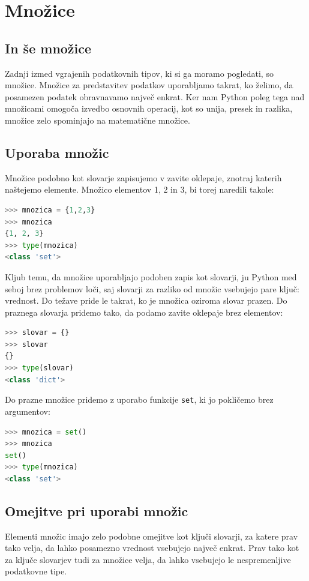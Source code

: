 \chapter{Množice}

\section{In še množice}

Zadnji izmed vgrajenih podatkovnih tipov, ki si ga moramo pogledati, so množice. Množice za predstavitev podatkov uporabljamo takrat, ko želimo, da posamezen podatek obravnavamo največ enkrat. Ker nam Python poleg tega nad množicami omogoča izvedbo osnovnih operacij, kot so unija, presek in razlika, množice zelo spominjajo na matematične množice. 

\section{Uporaba množic}

Množice podobno kot slovarje zapisujemo v zavite oklepaje, znotraj katerih naštejemo elemente. Množico elementov 1, 2 in 3, bi torej naredili takole:
\begin{lstlisting}[language=Python, showstringspaces=false]
>>> mnozica = {1,2,3}
>>> mnozica
{1, 2, 3}
>>> type(mnozica)
<class 'set'>
\end{lstlisting}
Kljub temu, da množice uporabljajo podoben zapis kot slovarji, ju Python med seboj brez problemov loči, saj slovarji za razliko od množic vsebujejo pare ključ: vrednost. Do težave pride le takrat, ko je množica oziroma slovar prazen. Do praznega slovarja pridemo tako, da podamo zavite oklepaje brez elementov:
\begin{lstlisting}[language=Python, showstringspaces=false]
>>> slovar = {}
>>> slovar
{}
>>> type(slovar)
<class 'dict'>
\end{lstlisting}
Do prazne množice pridemo z uporabo funkcije \texttt{set}, ki jo pokličemo brez argumentov:
\begin{lstlisting}[language=Python, showstringspaces=false]
>>> mnozica = set()
>>> mnozica
set()
>>> type(mnozica)
<class 'set'>
\end{lstlisting}

\section{Omejitve pri uporabi množic}

Elementi množic imajo zelo podobne omejitve kot ključi slovarji, za katere prav tako velja, da lahko posamezno vrednost vsebujejo največ enkrat. Prav tako kot za ključe slovarjev tudi za množice velja, da lahko vsebujejo le nespremenljive podatkovne tipe. 


